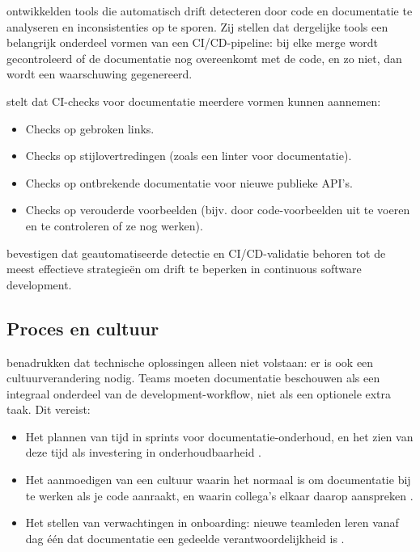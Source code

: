 \textcite{romeo2024didrift} ontwikkelden tools die automatisch drift detecteren door code en documentatie te analyseren en inconsistenties op te sporen. Zij stellen dat dergelijke tools een belangrijk onderdeel vormen van een CI/CD-pipeline: bij elke merge wordt gecontroleerd of de documentatie nog overeenkomt met de code, en zo niet, dan wordt een waarschuwing gegenereerd.

\textcite{gentle2017docslikecode} stelt dat CI-checks voor documentatie meerdere vormen kunnen aannemen:

\begin{itemize}
    \item Checks op gebroken links.
    \item Checks op stijlovertredingen (zoals een linter voor documentatie).
    \item Checks op ontbrekende documentatie voor nieuwe publieke API's.
    \item Checks op verouderde voorbeelden (bijv. door code-voorbeelden uit te voeren en te controleren of ze nog werken).
\end{itemize}

\textcite{theunissen2022mappingdocumentatie} bevestigen dat geautomatiseerde detectie en CI/CD-validatie behoren tot de meest effectieve strategieën om drift te beperken in continuous software development.

\subsection{Proces en cultuur}
\textcite{bhatti2021docsdevelopers} benadrukken dat technische oplossingen alleen niet volstaan: er is ook een cultuurverandering nodig. Teams moeten documentatie beschouwen als een integraal onderdeel van de development-workflow, niet als een optionele extra taak. Dit vereist:

\begin{itemize}
    \item Het plannen van tijd in sprints voor documentatie-onderhoud, en het zien van deze tijd als investering in onderhoudbaarheid \autocite{tripathy2014softwareevolution}.
    \item Het aanmoedigen van een cultuur waarin het normaal is om documentatie bij te werken als je code aanraakt, en waarin collega's elkaar daarop aanspreken \autocite{gentle2017docslikecode}.
    \item Het stellen van verwachtingen in onboarding: nieuwe teamleden leren vanaf dag één dat documentatie een gedeelde verantwoordelijkheid is \autocite{bhatti2021docsdevelopers}.
\end{itemize}

